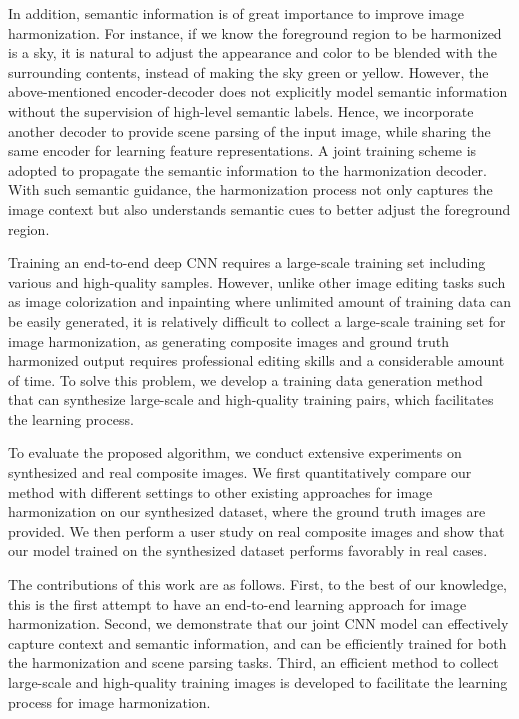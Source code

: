 \documentclass[10pt,twocolumn,letterpaper]{article}
\begin{document}
In addition, semantic information is of great importance  to improve image harmonization.
%
For instance, if we know the foreground region to be harmonized is a sky, 
it is natural to adjust the appearance and color to be blended with the surrounding contents, 
instead of making the sky green or yellow. 
%
However, the above-mentioned encoder-decoder does not explicitly model semantic information without the supervision of high-level semantic labels.
%
Hence, we incorporate another decoder to provide scene parsing of the input image, while sharing the same encoder for learning feature representations.
%
A joint training scheme is adopted to propagate the semantic information to the harmonization decoder.
%
With such semantic guidance, the harmonization process not only captures the image context but also understands semantic cues to better adjust the foreground region.
%

Training an end-to-end deep CNN requires a large-scale training set including various and high-quality samples.
%
%
However, unlike other image editing tasks such as image colorization \cite{Zhang_ECCV_2016} and inpainting \cite{Pathak_CVPR_2016} where unlimited amount of training data can be easily generated, it is relatively difficult to collect a large-scale training set for image harmonization, as generating composite images and ground truth harmonized output requires professional editing skills and a considerable amount of time.
%
To solve this problem, we develop a training data generation method that can synthesize large-scale and high-quality training pairs, which facilitates the learning process.
%

To evaluate the proposed algorithm, we conduct extensive experiments on synthesized and real composite images.
%
We first quantitatively compare our method with different settings to other existing approaches for image harmonization on our synthesized dataset, where the ground truth images 
are provided.
%
We then perform a user study on real composite images and show that our model trained on the synthesized dataset performs favorably in real cases.
%

The contributions of this work are as follows.
%
First, to the best of our knowledge, this is the first attempt to have an end-to-end learning approach for image harmonization. 
%
Second, we demonstrate that our joint CNN model can effectively capture context and semantic information, and can be efficiently trained for both the harmonization and scene parsing tasks.
%
%
Third, an efficient method to collect large-scale and high-quality training images is developed to facilitate the learning process for image harmonization.
%
\end{document}
